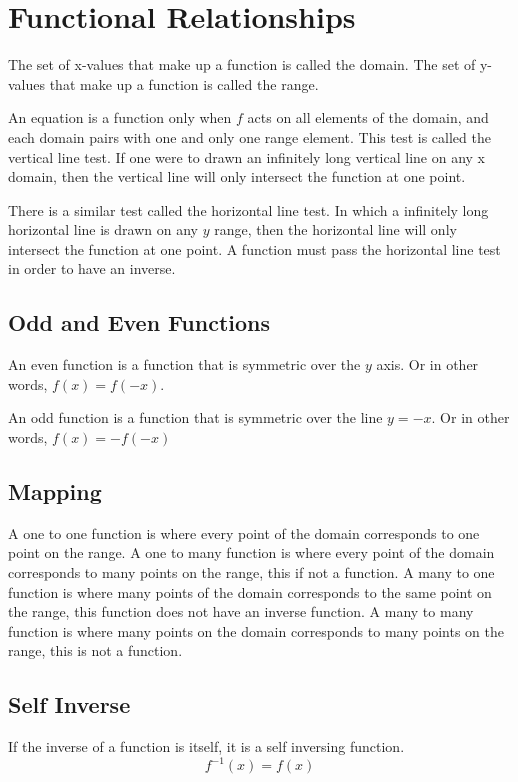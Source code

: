\documentclass[../notes.tex]{subfiles}
\begin{document}
\section{Functional Relationships}
The set of x-values that make up a function is called the domain.
The set of y-values that make up a function is called the range.

An equation is a function only when $f$ acts on all elements of the domain, and each domain pairs with one and only one range element.
This test is called the vertical line test.
If one were to drawn an infinitely long vertical line on any x domain, then the vertical line will only intersect the function at one point.

There is a similar test called the horizontal line test. 
In which a infinitely long horizontal line is drawn on any $y$ range, then the horizontal line will only intersect the function at one point.
A function must pass the horizontal line test in order to have an inverse.

\subsection{Odd and Even Functions}
An even function is a function that is symmetric over the $y$ axis.
Or in other words, $f(x) = f(-x)$.

An odd function is a function that is symmetric over the line $y=-x$.
Or in other words, $f(x) = -f(-x)$

\subsection{Mapping}
A one to one function is where every point of the domain corresponds to one point on the range.
A one to many function is where every point of the domain corresponds to many points on the range, this if not a function.
A many to one function is where many points of the domain corresponds to the same point on the range, this function does not have an inverse function.
A many to many function is where many points on the domain corresponds to many points on the range, this is not a function.

\subsection{Self Inverse}
If the inverse of a function is itself, it is a self inversing function.
\begin{equation}
	f^{-1}(x) = f(x)
\end{equation}
\end{document}
